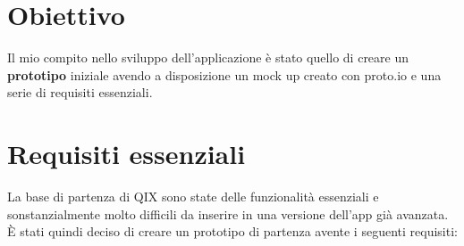 
\section{Obiettivo}

Il mio compito nello sviluppo dell'applicazione è stato quello 
di creare un \textbf{prototipo} iniziale avendo a disposizione un mock up creato con
proto.io\cite{protoio} e una serie di requisiti essenziali.

\section{Requisiti essenziali}

La base di partenza di QIX sono state delle funzionalità essenziali e 
sonstanzialmente molto difficili da inserire in una versione dell'app già avanzata.
È stati quindi deciso di creare un prototipo di partenza avente i seguenti requisiti:

